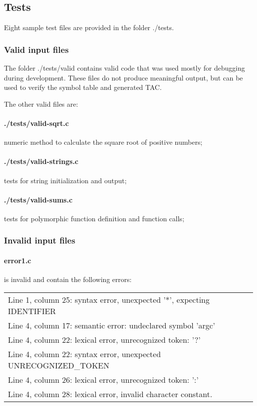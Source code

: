 
\subsection{Tests}
Eight sample test files are provided in the folder ./tests.

\subsubsection{Valid input files}
The folder ./tests/valid contains valid code that was used mostly for debugging during development.
These files do not produce meaningful output, but can be used to verify the symbol table and generated
TAC.

The other valid files are:

\paragraph{./tests/valid-sqrt.c} numeric method to calculate the square root of positive numbers;
\paragraph{./tests/valid-strings.c} tests for string initialization and output;
\paragraph{./tests/valid-sums.c} tests for polymorphic function definition and function calls;


\subsubsection{Invalid input files}
\paragraph{error1.c} is invalid and contain the following errors:

\begin{tabular}{l}
Line 1, column 25: syntax error, unexpected '*', expecting IDENTIFIER \\
Line 4, column 17: semantic error: undeclared symbol 'argc' \\
Line 4, column 22: lexical error, unrecognized token: '?' \\
Line 4, column 22: syntax error, unexpected UNRECOGNIZED\_TOKEN  \\
Line 4, column 26: lexical error, unrecognized token: ':'  \\
Line 4, column 28: lexical error, invalid character constant.  \\
\end{tabular}

